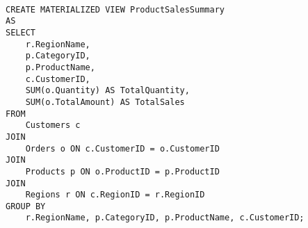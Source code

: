 
         \begin{lstlisting}

CREATE MATERIALIZED VIEW ProductSalesSummary
AS
SELECT
    r.RegionName,
    p.CategoryID,
    p.ProductName,
    c.CustomerID,
    SUM(o.Quantity) AS TotalQuantity,
    SUM(o.TotalAmount) AS TotalSales
FROM
    Customers c
JOIN
    Orders o ON c.CustomerID = o.CustomerID
JOIN
    Products p ON o.ProductID = p.ProductID
JOIN
    Regions r ON c.RegionID = r.RegionID
GROUP BY
    r.RegionName, p.CategoryID, p.ProductName, c.CustomerID;

        \end{lstlisting}